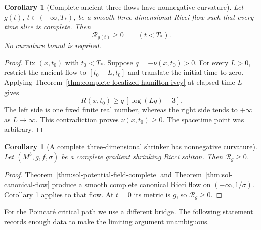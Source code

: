 \documentclass[10pt]{coll-l}
\newtheorem{corollary}[theorem]{Corollary}
\theoremstyle{definition}
\theoremstyle{remark}
\numberwithin{section}{chapter}
\numberwithin{equation}{chapter}
\begin{document}
\begin{corollary}[Complete ancient three-flows have nonnegative curvature]
\label{cor:complete-ancient-three-nonnegative}
Let $g(t)$, $t\in(-\infty,T_*)$, be a smooth three-dimensional Ricci flow
such that every time slice is complete.  Then
\begin{equation}
                         \mathcal R_{g(t)}\geq0
                         \qquad(t<T_*).                  \label{eq:complete-ancient-three-nonnegative}
\end{equation}
No curvature bound is required.
\end{corollary}

\begin{proof}
Fix $(x,t_0)$ with $t_0<T_*$.  Suppose
$q=-\nu(x,t_0)>0$.  For every $L>0$, restrict the ancient flow to
$[t_0-L,t_0]$ and translate the initial time to zero.  Applying
Theorem~\ref{thm:complete-localized-hamilton-ivey} at elapsed time $L$
gives
\[
                         R(x,t_0)\geq q\,[\log(Lq)-3].
\]
The left side is one fixed finite real number, whereas the right side tends
to $+\infty$ as $L\to\infty$.  This contradiction proves $\nu(x,t_0)\geq0$.
The spacetime point was arbitrary.
\end{proof}

\begin{corollary}[A complete three-dimensional shrinker has
nonnegative curvature]
\label{cor:complete-three-shrinker-nonnegative}
Let $(M^3,g,f,\sigma)$ be a complete gradient shrinking Ricci soliton.
Then $\mathcal R_g\geq0$.
\end{corollary}

\begin{proof}
Theorem~\ref{thm:sol-potential-field-complete} and
Theorem~\ref{thm:sol-canonical-flow} produce a smooth complete canonical
Ricci flow on $(-\infty,1/\sigma)$.  Corollary
\ref{cor:complete-ancient-three-nonnegative} applies to that flow.  At
$t=0$ its metric is $g$, so $\mathcal R_g\geq0$.
\end{proof}

For the Poincar\'e critical path we use a different bridge.  The following
statement records enough data to make the limiting argument unambiguous.
\end{document}
